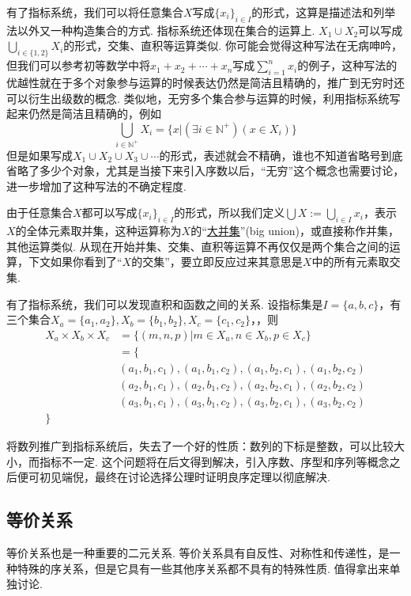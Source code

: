 \documentclass[main.tex]{subfiles}
\begin{document}
有了指标系统，我们可以将任意集合\(X\)写成\(\{x_i\}_{i \in I}\)的形式，这算是描述法和列举法以外又一种构造集合的方式. 指标系统还体现在集合的运算上. \(X_1 \cup X_2\)可以写成\(\displaystyle{\bigcup_{i \in \{1,2\}}X_i}\)的形式，交集、直积等运算类似. 你可能会觉得这种写法在无病呻吟，但我们可以参考初等数学中将\(x_1+x_2+\cdots+x_n\)写成\(\displaystyle{\sum_{i = 1}^{n}x_i}\)的例子，这种写法的优越性就在于多个对象参与运算的时候表达仍然是简洁且精确的，推广到无穷时还可以衍生出级数的概念. 类似地，无穷多个集合参与运算的时候，利用指标系统写起来仍然是简洁且精确的，例如
\[\bigcup_{i \in \mathbb{N^+}} X_i =\{x | (\exists i \in \mathbb{N^+})(x \in X_i)\} \]
但是如果写成\(X_1 \cup X_2 \cup X_3 \cup \cdots\)的形式，表述就会不精确，谁也不知道省略号到底省略了多少个对象，尤其是当接下来引入序数以后，“无穷”这个概念也需要讨论，进一步增加了这种写法的不确定程度.

由于任意集合\(X\)都可以写成\(\{x_i\}_{i \in I}\)的形式，所以我们定义\(\displaystyle{\bigcup X := \bigcup_{i \in I}x_i}\)，表示\(X\)的全体元素取并集，这种运算称为\(X\)的“\uline{大并集}”(big union)，或直接称作并集，其他运算类似. 从现在开始并集、交集、直积等运算不再仅仅是两个集合之间的运算，下文如果你看到了“\(X\)的交集”，要立即反应过来其意思是\(X\)中的所有元素取交集.

有了指标系统，我们可以发现直积和函数之间的关系. 设指标集是\(I = \{a,b,c\}\)，有三个集合\(X_a = \{a_1, a_2\}, X_b=\{b_1, b_2\}, X_c = \{c_1, c_2\}\)，，则
\begin{align*}
    X_a \times X_b \times X_c &= \{(m,n,p) | m \in X_a, n \in X_b, p \in X_c\} \\
    &= \{ \\
        &(a_1,b_1,c_1), (a_1, b_1, c_2), (a_1, b_2, c_1), (a_1, b_2, c_2) \\
        &(a_2,b_1,c_1), (a_2, b_1, c_2), (a_2, b_2, c_1), (a_2, b_2, c_2) \\
        &(a_3,b_1,c_1), (a_3, b_1, c_2), (a_3, b_2, c_1), (a_3, b_2, c_2) \\
    \}
\end{align*}

将数列推广到指标系统后，失去了一个好的性质：数列的下标是整数，可以比较大小，而指标不一定. 这个问题将在后文得到解决，引入序数、序型和序列等概念之后便可初见端倪，最终在讨论选择公理时证明良序定理以彻底解决.

\subsection{等价关系}

等价关系也是一种重要的二元关系. 等价关系具有自反性、对称性和传递性，是一种特殊的序关系，但是它具有一些其他序关系都不具有的特殊性质. 值得拿出来单独讨论.
\end{document}
